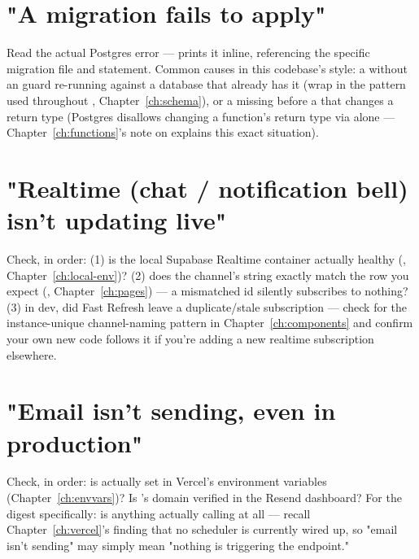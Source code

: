 \section*{"A migration fails to apply"}
\begin{olkhowto}
Read the actual Postgres error —  prints it inline, referencing the specific migration file and statement. Common causes in this codebase's style: a  without an  guard re-running against a database that already has it (wrap in the  pattern used throughout , Chapter~\ref{ch:schema}), or a  missing before a  that changes a return type (Postgres disallows changing a function's return type via  alone — Chapter~\ref{ch:functions}'s note on  explains this exact situation).
\end{olkhowto}

\section*{"Realtime (chat / notification bell) isn't updating live"}
Check, in order: (1) is the local Supabase Realtime container actually healthy (, Chapter~\ref{ch:local-env})? (2) does the channel's  string exactly match the row you expect (, Chapter~\ref{ch:pages}) — a mismatched id silently subscribes to nothing? (3) in dev, did Fast Refresh leave a duplicate/stale subscription — check for the instance-unique channel-naming pattern in Chapter~\ref{ch:components} and confirm your own new code follows it if you're adding a new realtime subscription elsewhere.

\section*{"Email isn't sending, even in production"}
Check, in order: is  actually set in Vercel's environment variables (Chapter~\ref{ch:envvars})? Is 's domain verified in the Resend dashboard? For the digest specifically: is anything actually calling  at all — recall Chapter~\ref{ch:vercel}'s finding that no scheduler is currently wired up, so "email isn't sending" may simply mean "nothing is triggering the endpoint."

